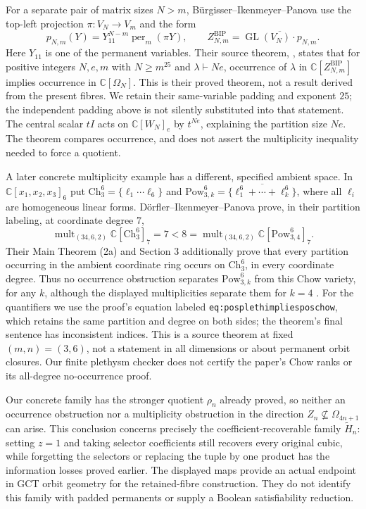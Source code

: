 For a separate pair of matrix sizes $N>m$, B\"urgisser--Ikenmeyer--Panova
use the top-left projection $\pi:V_N\to V_m$ and the form
\[
 p_{N,m}(Y)=Y_{11}^{N-m}\operatorname{per}_m(\pi Y),\qquad
 Z^{\mathrm{BIP}}_{N,m}=\overline{\operatorname{GL}(V_N)\cdot p_{N,m}}.
\]
Here $Y_{11}$ is one of the permanent variables. Their source theorem,
\cite[Theorem 1.4]{BIP2018Interface}, states that for positive integers
$N,e,m$ with $N\ge m^{25}$ and $\lambda\vdash Ne$, occurrence of
$\lambda$ in $\mathbb C[Z^{\mathrm{BIP}}_{N,m}]$ implies occurrence
in $\mathbb C[\Omega_N]$. This is their proved theorem, not a result
derived from the present fibres. We retain their same-variable padding
and exponent $25$; the independent padding above is not silently
substituted into that statement. The central scalar $tI$ acts on
$\mathbb C[W_N]_e$ by $t^{Ne}$, explaining the partition size $Ne$.
The theorem compares occurrence, and does not assert the multiplicity
inequality needed to force a quotient.

A later concrete multiplicity example has a different, specified ambient
space. In $\mathbb C[x_1,x_2,x_3]_6$ put
$\mathrm{Ch}_3^6=\{\ell_1\cdots\ell_6\}$ and
$\mathrm{Pow}_{3,k}^6=\overline{\{\ell_1^6+\cdots+\ell_k^6\}}$,
where all $\ell_i$ are homogeneous linear forms. D\"orfler--Ikenmeyer--Panova
prove, in their partition labeling, at coordinate degree $7$,
\[
 \operatorname{mult}_{(34,6,2)}\mathbb C[\mathrm{Ch}_3^6]_7
 =7<8=
 \operatorname{mult}_{(34,6,2)}\mathbb C[\mathrm{Pow}_{3,4}^6]_7.
\]
Their Main Theorem (2a) and Section 3 additionally prove that every
partition occurring in the ambient coordinate ring occurs on
$\mathrm{Ch}_3^6$, in every coordinate degree. Thus no occurrence
obstruction separates $\mathrm{Pow}_{3,k}^6$ from this Chow variety,
for any $k$, although the displayed multiplicities separate them for
$k=4$ \cite{DIP2019Interface}. For the quantifiers we use the proof's
equation labeled \texttt{eq:posplethimpliesposchow}, which retains
the same partition and degree on both sides; the theorem's final
sentence has inconsistent indices. This is a source theorem at fixed
$(m,n)=(3,6)$, not a statement in all dimensions or about permanent
orbit closures. Our finite plethysm checker does not certify the
paper's Chow ranks or its all-degree no-occurrence proof.

Our concrete family has the stronger quotient $\rho_n$ already proved,
so neither an occurrence obstruction nor a multiplicity obstruction
in the direction $Z_n\not\subseteq\Omega_{4n+1}$ can arise.
This conclusion concerns precisely the coefficient-recoverable family
$\widetilde H_n$: setting $z=1$ and taking selector coefficients still
recovers every original cubic, while forgetting the selectors or
replacing the tuple by one product has the information losses proved
earlier. The displayed maps provide an actual endpoint in GCT orbit
geometry for the retained-fibre construction. They do not identify this
family with padded permanents or supply a Boolean satisfiability reduction.

